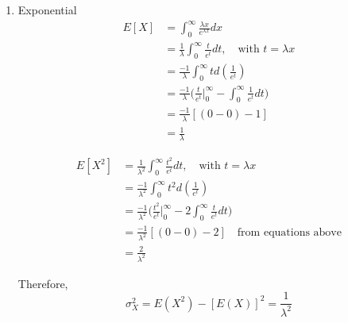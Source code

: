 \documentclass[UTF8]{article}
\begin{document}
    \begin{enumerate}
        \item Exponential
        \begin{equation*}
          \begin{split}
             E[X] & = \int_{0}^{\infty}\frac{\lambda x}{e^{\lambda x}}dx\\
               & = \frac{1}{\lambda}\int_{0}^{\infty}\frac{t}{e^t}dt,\quad\text{with $t=\lambda x$}\\
               &=\frac{-1}{\lambda}\int_{0}^{\infty}td(\frac{1}{e^t})\\
               & =\frac{-1}{\lambda}\bigg(\frac{t}{e^t}\bigg|^\infty_0-\int_{0}^{\infty}\frac{1}{e^t}dt\bigg)\\
               &=\frac{-1}{\lambda}[(0-0)-1]\\
               &=\frac{1}{\lambda}
          \end{split}
        \end{equation*}

        \begin{equation*}
          \begin{split}
             E[X^2] &=\frac{1}{\lambda^2}\int_{0}^{\infty}\frac{t^2}{e^t}dt,\quad\text{with $t=\lambda x$}\\
               &=\frac{-1}{\lambda^2}\int_{0}^{\infty}t^2d(\frac{1}{e^t})\\
               &=\frac{-1}{\lambda^2}\bigg(\frac{t^2}{e^t}\bigg|^\infty_0-2\int_{0}^{\infty}\frac{t}{e^t}dt\bigg)\\
               &=\frac{-1}{\lambda^2}[(0-0)-2]\quad\text{from equations above}\\
               &=\frac{2}{\lambda^2}
          \end{split}
        \end{equation*}

        Therefore, 
        \begin{equation*}
            \sigma^2_X= E(X^2)-[E(X)]^2=\frac{1}{\lambda^2}
        \end{equation*}


\end{enumerate}
\end{document}

